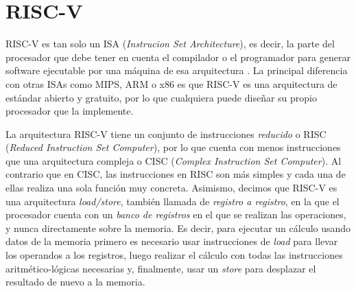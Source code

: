 \chapter{RISC-V}


RISC-V es tan solo un ISA (\textit{Instrucion Set Architecture}), es decir, la parte del procesador que debe tener en cuenta el compilador o el programador para generar software ejecutable por una máquina de esa arquitectura \cite{HenessyPattersonCAQA}. La principal diferencia con otras ISAs como MIPS, ARM o x86 es que RISC-V es una arquitectura de estándar abierto y gratuito, por lo que cualquiera puede diseñar su propio procesador que la implemente. 

La arquitectura RISC-V tiene un conjunto de instrucciones \textit{reducido} o RISC (\textit{Reduced Instruction Set Computer}), por lo que cuenta con menos instrucciones que una arquitectura compleja o CISC (\textit{Complex Instruction Set Computer}). Al contrario que en CISC, las instrucciones en RISC son más simples y cada una de ellas realiza una sola función muy concreta. Asimismo, decimos que RISC-V es una arquitectura \textit{load/store}, también llamada de \textit{registro a registro}, en la que el procesador cuenta con un \textit{banco de registros} en el que se realizan las operaciones, y nunca directamente sobre la memoria. Es decir, para ejecutar un cálculo usando datos de la memoria primero es necesario usar instrucciones de \textit{load} para llevar los operandos a los registros, luego realizar el cálculo con todas las instrucciones aritmético-lógicas necesarias y, finalmente, usar un \textit{store} para desplazar el resultado de nuevo a la memoria.

